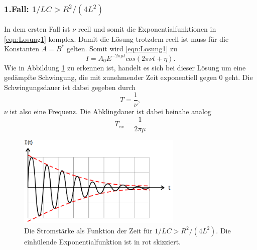\subsubsection*{1.Fall: $1/LC>R^2/(4L^2)$}
In dem ersten Fall ist $\nu$ reell und somit die Exponentialfunktionen in \eqref{eqn:Losung1} komplex. Damit die Lösung trotzdem reell ist muss
für die Konstanten $A=B^{*}$ gelten. Somit wird \eqref{eqn:Losung1} zu
\begin{equation*}
    I=A_0E^{-2\pi\mu t} cos(2\pi\nu t+\eta).
    \label{eqn:Fall1}
\end{equation*}
Wie in Abbildung \ref{fig:Fall1} zu erkennen ist, handelt es sich bei dieser Lösung um eine gedämpfte Schwingung, die mit zunehmender Zeit
exponentiell gegen 0 geht. Die Schwingungsdauer ist dabei gegeben durch
\begin{equation*}
    T=\frac{1}{\nu} ,
\end{equation*}
$\nu$ ist also eine Frequenz. Die Abklingdauer ist dabei beinahe analog
\begin{equation}
    T_{ex}=\frac{1}{2\pi\mu}
    \label{eqn:Tex}
\end{equation}
\begin{figure}[H]
    \centering
    \includegraphics[width=0.7\textwidth]{pictures/Fall1.png}
    \caption{Die Stromstärke als Funktion der Zeit für $1/LC>R^2/(4L^2)$. Die einhülende Exponentialfunktion ist in rot skizziert.\cite{AP01}}
    \label{fig:Fall1}
\end{figure}

